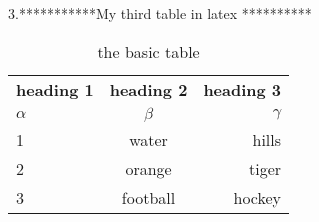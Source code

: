 \documentclass[12pt]{article}
\begin{document}
3.***********My third table in latex **********
\begin{table}[h]
\caption{the basic table}
\centering
\begin{tabular}{|l||c|r|}
\textbf{heading 1} & \textbf{heading 2} & \textbf{heading 3} \\ \cline{2-3}
$\alpha$  &  $\beta$  &  $\gamma$ \\ \hline 
1         &  water    &  hills  \\ 
2         &  orange   &  tiger  \\ \cline{1-1}
3         &  football &  hockey \\\cline{1-2}
\end{tabular}

\end{table}
\end{document}
